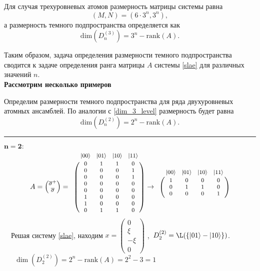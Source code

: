 Для случая трехуровневых атомов размерность матрицы системы равна
\begin{equation}
(M, N) = (6 \cdot 3^{n}, 3^{n}),
\end{equation}
а размерность темного подпространства определяется как
\begin{equation}\label{dim_3_level}
\mathrm{dim}(D_{n}^{(3)}) = 3^{n} - \mathrm{rank}(A).
\end{equation}

\noindent Таким образом, задача определения размерности темного подпространства сводится к задаче определения ранга матрицы $A$ системы \eqref{slae} для различных значений $n$.
\\[36pt]
\noindent \textbf{Рассмотрим несколько примеров}

\noindent Определим размерности темного подпространства для ряда двухуровневых атомных ансамблей. По аналогии с \eqref{dim_3_level} размерность будет равна
\begin{equation}
\mathrm{dim}(D_{n}^{(2)}) = 2^{n} - \mathrm{rank}(A).
\end{equation}

\clearpage
\medskip\hrule\medskip
\noindent$\mathbf{n = 2:}$
\begin{equation}\label{eq:matrix2}
	{\footnotesize
		A =
		\begin{pmatrix}
			\overline{\s}^{+}\\
			\overline{\s}
		\end{pmatrix}=
		\bordermatrix{
			& |00\ra & |01\ra & |10\ra & |11\ra \cr
			& 0 & 1 & 1 & 0 \cr
			& 0 & 0 & 0 & 1 \cr
			& 0 & 0 & 0 & 1 \cr
			& 0 & 0 & 0 & 0 \cr
			& 0 & 0 & 0 & 0 \cr
			& 1 & 0 & 0 & 0 \cr
			& 1 & 0 & 0 & 0 \cr
			& 0 & 1 & 1 & 0 \cr
		}\rightarrow
		\bordermatrix{
			& |00\ra & |01\ra & |10\ra & |11\ra \cr
			& 1 & 0 & 0 & 0 \cr
			& 0 & 1 & 1 & 0 \cr
			& 0 & 0 & 0 & 1 \cr
		}
	}
\end{equation}
\quad\quad~~Решая систему \eqref{slae}, находим
{\footnotesize
	$x =
	\begin{pmatrix}
		0\\
		\xi\\
		-\xi\\
		0
	\end{pmatrix}
	$
},\
\quad$D^{(2)}_2 = \L(\{|01\ra - |10\ra\})$.\\[12pt]

\noindent\quad\quad~~~$\dim(D^{(2)}_2) = 2^{n} - \mathrm{rank}(A) = 2^{2} - 3 = 1$\\

